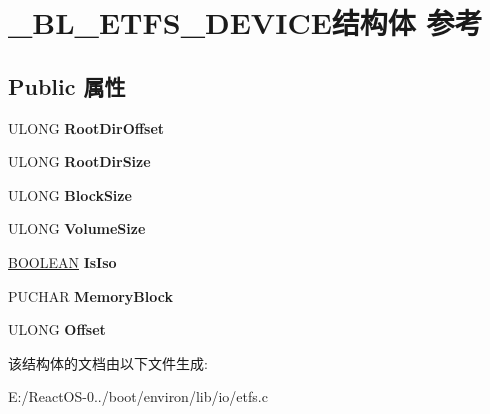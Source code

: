 \hypertarget{struct___b_l___e_t_f_s___d_e_v_i_c_e}{}\section{\+\_\+\+B\+L\+\_\+\+E\+T\+F\+S\+\_\+\+D\+E\+V\+I\+C\+E结构体 参考}
\label{struct___b_l___e_t_f_s___d_e_v_i_c_e}
\subsection*{Public 属性}
\begin{DoxyCompactItemize}
\item 
\mbox{\label{struct___b_l___e_t_f_s___d_e_v_i_c_e_a56c10c675fd7100961f3072eaec1410b}} 
U\+L\+O\+NG {\bfseries Root\+Dir\+Offset}
\item 
\mbox{\label{struct___b_l___e_t_f_s___d_e_v_i_c_e_a0f250246f447338916cbd24cf83c4bec}} 
U\+L\+O\+NG {\bfseries Root\+Dir\+Size}
\item 
\mbox{\label{struct___b_l___e_t_f_s___d_e_v_i_c_e_a6e87b89b560cee6f68d6edd1cb35e267}} 
U\+L\+O\+NG {\bfseries Block\+Size}
\item 
\mbox{\label{struct___b_l___e_t_f_s___d_e_v_i_c_e_af4c93e5cd7282d9de741a546797de184}} 
U\+L\+O\+NG {\bfseries Volume\+Size}
\item 
\mbox{\label{struct___b_l___e_t_f_s___d_e_v_i_c_e_a04c3b95d3087ab4c7d1bad57739d20b4}} 
\hyperlink{_processor_bind_8h_a112e3146cb38b6ee95e64d85842e380a}{B\+O\+O\+L\+E\+AN} {\bfseries Is\+Iso}
\item 
\mbox{\label{struct___b_l___e_t_f_s___d_e_v_i_c_e_aa2574103baf5d96f46fdf1aca16457b5}} 
P\+U\+C\+H\+AR {\bfseries Memory\+Block}
\item 
\mbox{\label{struct___b_l___e_t_f_s___d_e_v_i_c_e_aff78740203247533ade9c18e38789d43}} 
U\+L\+O\+NG {\bfseries Offset}
\end{DoxyCompactItemize}


该结构体的文档由以下文件生成\+:\begin{DoxyCompactItemize}
\item 
E\+:/\+React\+O\+S-\/0../boot/environ/lib/io/etfs.\+c\end{DoxyCompactItemize}
